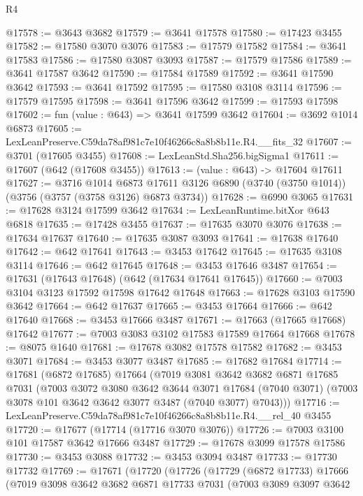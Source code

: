 \begin{lexlean}{R4}
\begin{coremodule}
@17578 := @3643 @3682
@17579 := @3641 @17578
@17580 := @17423 @3455
@17582 := @17580 @3070 @3076
@17583 := @17579 @17582
@17584 := @3641 @17583
@17586 := @17580 @3087 @3093
@17587 := @17579 @17586
@17589 := @3641 @17587 @3642
@17590 := @17584 @17589
@17592 := @3641 @17590 @3642
@17593 := @3641 @17592
@17595 := @17580 @3108 @3114
@17596 := @17579 @17595
@17598 := @3641 @17596 @3642
@17599 := @17593 @17598
@17602 := fun (value : @643) => @3641 @17599 @3642
@17604 := @3692 @1014 @6873
@17605 := LexLeanPreserve.C59da78af981c7e10f46266c8a8b8b11e.R4.__fits_32
@17607 := @3701 (@17605 @3455)
@17608 := LexLeanStd.Sha256.bigSigma1
@17611 := @17607 (@642 (@17608 @3455))
@17613 := (value : @643) -> @17604 @17611
@17627 := @3716
    @1014
    @6873
    @17611
    @3126
    @6890
    (@3740 (@3750 @1014))
    (@3756 (@3757 (@3758 @3126) @6873 @3734))
@17628 := @6990 @3065
@17631 := @17628 @3124 @17599 @3642
@17634 := LexLeanRuntime.bitXor @643 @6818
@17635 := @17428 @3455
@17637 := @17635 @3070 @3076
@17638 := @17634 @17637
@17640 := @17635 @3087 @3093
@17641 := @17638 @17640
@17642 := @642 @17641
@17643 := @3453 @17642
@17645 := @17635 @3108 @3114
@17646 := @642 @17645
@17648 := @3453 @17646 @3487
@17654 := @17631 (@17643 @17648) (@642 (@17634 @17641 @17645))
@17660 := @7003 @3104 @3123 @17592 @17598 @17642 @17648
@17663 := @17628 @3103 @17590 @3642
@17664 := @642 @17637
@17665 := @3453 @17664
@17666 := @642 @17640
@17668 := @3453 @17666 @3487
@17671 := @17663 (@17665 @17668) @17642
@17677 := @7003 @3083 @3102 @17583 @17589 @17664 @17668
@17678 := @8075 @1640
@17681 := @17678 @3082 @17578 @17582
@17682 := @3453 @3071
@17684 := @3453 @3077 @3487
@17685 := @17682 @17684
@17714 := @17681
    (@6872 @17685)
    @17664
    (@7019
      @3081
      @3642
      @3682
      @6871
      @17685
      @7031
      (@7003
        @3072
        @3080
        @3642
        @3644
        @3071
        @17684
        (@7040 @3071)
        (@7003 @3078 @101 @3642 @3642 @3077 @3487 (@7040 @3077) @7043)))
@17716 := LexLeanPreserve.C59da78af981c7e10f46266c8a8b8b11e.R4.__rel_40 @3455
@17720 := @17677 (@17714 (@17716 @3070 @3076))
@17726 := @7003 @3100 @101 @17587 @3642 @17666 @3487
@17729 := @17678 @3099 @17578 @17586
@17730 := @3453 @3088
@17732 := @3453 @3094 @3487
@17733 := @17730 @17732
@17769 := @17671
    (@17720
      (@17726
        (@17729
          (@6872 @17733)
          @17666
          (@7019
            @3098
            @3642
            @3682
            @6871
            @17733
            @7031
            (@7003
              @3089
              @3097
              @3642

\end{coremodule}
\end{lexlean}
